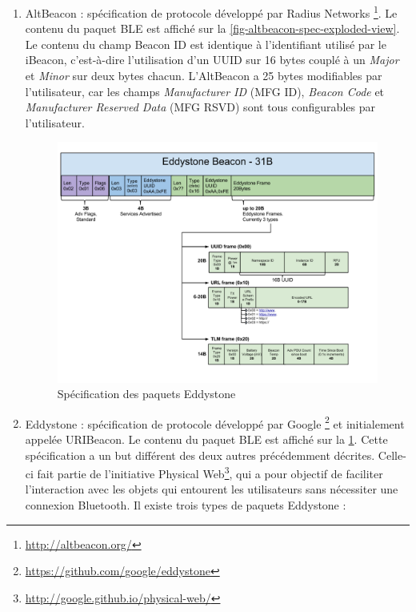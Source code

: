 \begin{enumerate}
    \item AltBeacon : spécification de protocole développé par Radius Networks \footnote{\url{http://altbeacon.org/}}. Le contenu du paquet BLE est affiché sur la \cref{fig-altbeacon-spec-exploded-view}. Le contenu du champ Beacon ID est identique à l'identifiant utilisé par le iBeacon, c'est-à-dire l'utilisation d'un UUID sur 16 bytes couplé à un \textit{Major} et \textit{Minor} sur deux bytes chacun. L'AltBeacon a 25 bytes modifiables par l'utilisateur, car les champs \textit{Manufacturer ID }(MFG ID), \textit{Beacon Code} et \textit{Manufacturer Reserved Data} (MFG RSVD) sont tous configurables par l'utilisateur. 


\begin{figure}[ht!]
\centering
\includegraphics[width=1.0\textwidth]{Figures/Protocols/Bluetooth/eddystone-spec-exploded-view.png}
\caption{Spécification des paquets Eddystone}
\label{fig-eddystone-spec-exploded-view}
\end{figure}
    \item Eddystone : spécification de protocole développé par Google \footnote{\url{https://github.com/google/eddystone}} et initialement appelée URIBeacon. Le contenu du paquet BLE est affiché sur la \cref{fig-eddystone-spec-exploded-view}. Cette spécification a un but différent des deux autres précédemment décrites. Celle-ci fait partie de l'initiative Physical Web\footnote{\url{http://google.github.io/physical-web/}}, qui a pour objectif de faciliter l'interaction avec les objets qui entourent les utilisateurs sans nécessiter une connexion Bluetooth. Il existe trois types de paquets Eddystone :
    \begin{enumerate}

\end{enumerate}
\end{enumerate}
